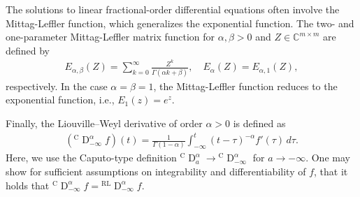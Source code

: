 \documentclass{svproc}
\newcommand{\RLderivativeInput}[2]{{}^\mathrm{RL}\operatorname{D}_{#2}^{#1}}
\newcommand{\CderivativeInput}[2]{{}^\mathrm{C}\operatorname{D}_{#2}^{#1}}
\begin{document}
{		The solutions to linear fractional-order differential equations often involve the Mittag-Leffler function, which generalizes the exponential function. The two- and one-parameter Mittag-Leffler matrix function for $\alpha,\beta>0$ and $Z \in \mathbb C ^{m\times m}$ are defined by
		\begin{align}
			E_{\alpha,\beta}(Z) = \sum_{k=0}^{\infty} \frac{Z^k}{\Gamma(\alpha k + \beta)},\quad  E_\alpha(Z) =E_{\alpha,1}(Z),
		\end{align}
        respectively. In the case $\alpha = \beta= 1$, the Mittag-Leffler function reduces to the exponential function, i.e., $E_1(z) = e^z$.
		
		Finally, the Liouville--Weyl derivative of order $\alpha > 0$ is defined as
		\begin{align}
			(\CderivativeInput{\alpha}{-\infty} f)(t) = \frac{1}{\Gamma(1 - \alpha)}  \int_{-\infty}^t (t - \tau)^{- \alpha} f'(\tau)\,d\tau.
		\end{align} Here, we use the Caputo-type definition $\CderivativeInput{\alpha}{a} \to \CderivativeInput{\alpha}{-\infty}$ for $a \to -\infty$. One may show for sufficient assumptions on integrability and differentiability of $f$, that it holds that $\CderivativeInput{\alpha}{-\infty}f = \RLderivativeInput{\alpha}{-\infty}f$. 
		
}
\end{document}
